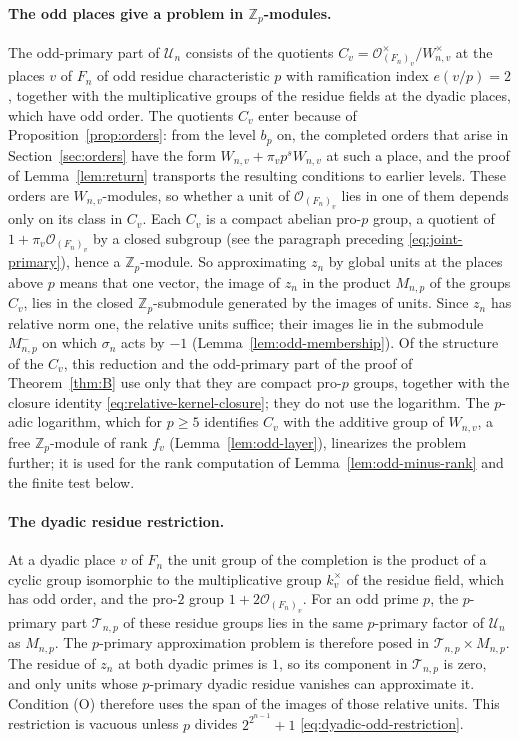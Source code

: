 \documentclass[11pt]{article}
\theoremstyle{plain}
\theoremstyle{definition}
\theoremstyle{remark}
\newcommand{\Z}{\mathbb Z}
\newcommand{\OO}{\mathcal O}
\begin{document}
\paragraph{The odd places give a problem in $\Z_p$-modules.}  The
odd-primary part of $\mathcal U_n$ consists of the quotients
$C_v=\OO_{(F_n)_v}^\times/W_{n,v}^\times$ at the places $v$ of $F_n$ of
odd residue characteristic $p$ with ramification index $e(v/p)=2$,
together with the multiplicative groups of the residue fields at the
dyadic places, which have odd order.  The quotients $C_v$ enter because of
Proposition~\ref{prop:orders}: from the level $b_p$ on, the completed
orders that arise in Section~\ref{sec:orders} have the form
$W_{n,v}+\pi_vp^{s}W_{n,v}$ at such a place, and the proof of
Lemma~\ref{lem:return} transports the resulting conditions to earlier
levels.  These orders are $W_{n,v}$-modules, so whether a unit of
$\OO_{(F_n)_v}$ lies in one of them depends only on its class in
$C_v$.  Each $C_v$ is a compact abelian pro-$p$ group, a quotient of
$1+\pi_v\OO_{(F_n)_v}$ by a closed subgroup (see the paragraph preceding
\eqref{eq:joint-primary}), hence a $\Z_p$-module.  So approximating
$z_n$ by global units at the places above $p$ means that one vector, the
image of $z_n$ in the product $M_{n,p}$ of the groups $C_v$, lies in the
closed $\Z_p$-submodule generated by the images of units.  Since $z_n$
has relative norm one, the relative units suffice; their images lie in
the submodule $M_{n,p}^-$ on which $\sigma_n$ acts by $-1$
(Lemma~\ref{lem:odd-membership}).  Of the structure of the $C_v$, this
reduction and the odd-primary part of the proof of Theorem~\ref{thm:B}
use only that they are compact pro-$p$ groups, together with the closure
identity \eqref{eq:relative-kernel-closure}; they do not use the
logarithm.  The $p$-adic logarithm, which for
$p\ge5$ identifies $C_v$ with the additive group of $W_{n,v}$, a free
$\Z_p$-module of rank $f_v$ (Lemma~\ref{lem:odd-layer}), linearizes the
problem further; it is used for the rank computation of
Lemma~\ref{lem:odd-minus-rank} and the finite test below.

\paragraph{The dyadic residue restriction.}  At a dyadic place $v$ of
$F_n$ the unit group of the completion is the product of a cyclic group
isomorphic to the multiplicative group $k_v^\times$ of the residue field,
which has odd order, and the pro-$2$ group $1+2\OO_{(F_n)_v}$.  For an odd
prime $p$, the $p$-primary part $\mathcal T_{n,p}$ of these residue
groups lies in the same $p$-primary factor of $\mathcal U_n$ as
$M_{n,p}$.  The $p$-primary approximation problem is therefore posed in
$\mathcal T_{n,p}\times M_{n,p}$.  The residue of $z_n$ at both dyadic
primes is $1$, so its component in $\mathcal T_{n,p}$ is zero, and only units whose
$p$-primary dyadic residue vanishes can approximate it.  Condition (O)
therefore uses the span of the images of those relative units.  This
restriction is vacuous unless $p$ divides $2^{2^{n-1}}+1$
\eqref{eq:dyadic-odd-restriction}.
\end{document}
